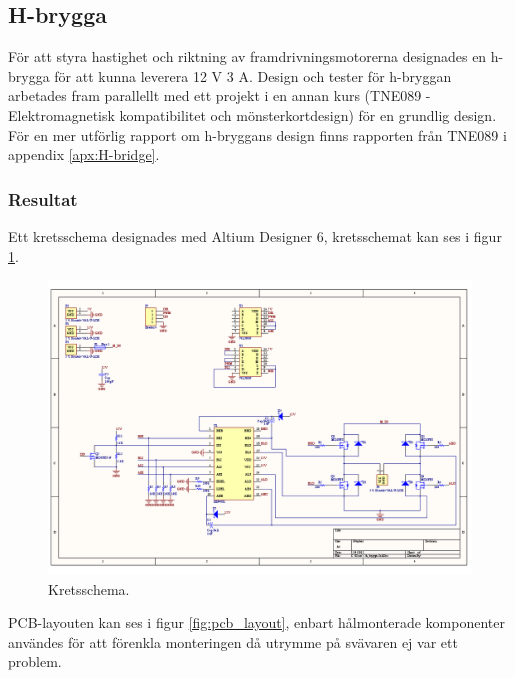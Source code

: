 \subsection{H-brygga}
För att styra hastighet och riktning av framdrivningsmotorerna designades en
h-brygga för att kunna leverera 12 V 3 A. Design och tester för h-bryggan
arbetades fram parallellt med ett projekt i en annan kurs (TNE089 -
Elektromagnetisk kompatibilitet och mönsterkortdesign) för en grundlig design.
För en mer utförlig rapport om h-bryggans design finns rapporten från TNE089 i
appendix \ref{apx:H-bridge}.

\subsubsection{Resultat}
Ett kretsschema designades med Altium Designer 6, kretsschemat kan ses i figur \ref{fig:h_brygga_schema}.

\begin{landscape}
\begin{figure}[htbp!]
\centering
\includegraphics[width=18cm]{../../includes/figures/h_brygga_schematic}
\caption{Kretsschema.}
\label{fig:h_brygga_schema}
\end{figure}
\end{landscape}

PCB-layouten kan ses i figur \ref{fig:pcb_layout}, enbart hålmonterade komponenter användes för att förenkla monteringen då utrymme på svävaren ej var ett problem.

